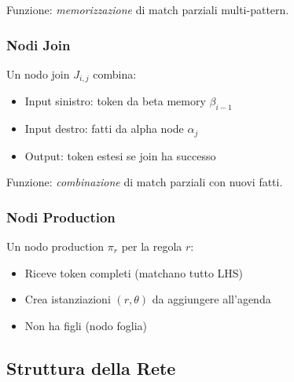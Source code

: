Funzione: \textit{memorizzazione} di match parziali multi-pattern.

\subsubsection{Nodi Join}

\begin{definizione}
Un nodo join $J_{i,j}$ combina:
\begin{itemize}
\item Input sinistro: token da beta memory $\beta_{i-1}$
\item Input destro: fatti da alpha node $\alpha_j$
\item Output: token estesi se join ha successo
\end{itemize}
\end{definizione}

Funzione: \textit{combinazione} di match parziali con nuovi fatti.

\subsubsection{Nodi Production}

\begin{definizione}
Un nodo production $\pi_r$ per la regola $r$:
\begin{itemize}
\item Riceve token completi (matchano tutto LHS)
\item Crea istanziazioni $(r, \theta)$ da aggiungere all'agenda
\item Non ha figli (nodo foglia)
\end{itemize}
\end{definizione}

\subsection{Struttura della Rete}

